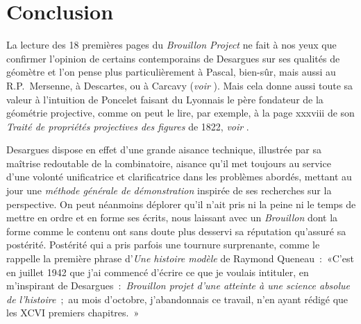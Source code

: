 \documentclass[12pt, a4paper]{article}
\begin{document}

\section{Conclusion}
La lecture des 18 premières pages du \textit{Brouillon Project} ne fait à nos yeux que confirmer l'opinion de certains contemporains de Desargues sur ses qualités de géomètre et l'on pense plus particulièrement à Pascal, bien-sûr, mais aussi au R.P.~Mersenne, à Descartes, ou à Carcavy (\textit{voir} \cite{taton}). Mais cela donne aussi toute sa valeur à l'intuition de Poncelet faisant du Lyonnais le père fondateur de la géométrie projective, comme on peut le lire, par exemple, à la page xxxviii de son \textit{Traité de propriétés projectives des figures} de 1822, \textit{voir} \cite{poncelet}.

Desargues dispose en effet d'une grande aisance technique, illustrée par sa maîtrise redoutable de la combinatoire, aisance qu'il met toujours au service d'une volonté unificatrice et clarificatrice dans les problèmes abordés, mettant au jour une \textit{méthode générale de démonstration} inspirée de ses recherches sur la perspective. On peut néanmoins déplorer qu'il n'ait pris ni la peine ni le temps de mettre en ordre et en forme ses écrits, nous laissant avec un \textit{Brouillon} dont la forme comme le contenu ont sans doute plus desservi sa réputation qu'assuré sa postérité. Postérité qui a pris parfois une tournure surprenante, comme le rappelle la première phrase d'\textit{Une histoire modèle} de Raymond Queneau~:~«C'est en juillet 1942 que j'ai commencé d'écrire ce que je voulais intituler, en m'inspirant de Desargues~:~\textit{Brouillon projet d'une atteinte à une science absolue de l'histoire}~;~au mois d'octobre, j'abandonnais ce travail, n'en ayant rédigé que les XCVI premiers chapitres.~»
\end{document}
